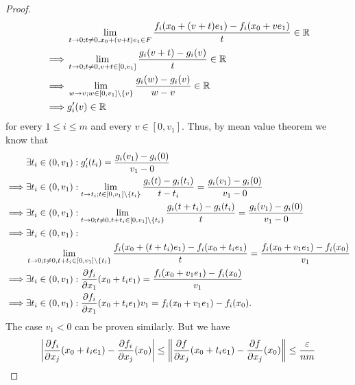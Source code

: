 \begin{proof}
\begin{align*}
             & \lim_{t \to 0 ; t \neq 0, x_0 + (v + t) e_1 \in F} \dfrac{f_i(x_0 + (v + t) e_1) - f_i(x_0 + v e_1)}{t} \in \R \\
    \implies & \lim_{t \to 0 ; t \neq 0, v + t \in [0, v_1]} \dfrac{g_i(v + t) - g_i(v)}{t} \in \R                            \\
    \implies & \lim_{w \to v ; w \in [0, v_1] \setminus \set{v}} \dfrac{g_i(w) - g_i(v)}{w - v} \in \R                        \\
    \implies & g_i'(v) \in \R
  \end{align*}
  for every \(1 \leq i \leq m\) and every \(v \in [0, v_1]\).
  Thus, by mean value theorem we know that
  \begin{align*}
             & \exists t_i \in (0, v_1) : g_i'(t_i) = \dfrac{g_i(v_1) - g_i(0)}{v_1 - 0}                                                                                                \\
    \implies & \exists t_i \in (0, v_1) : \lim_{t \to t_i; t \in [0, v_1] \setminus \set{t_i}} \dfrac{g_i(t) - g_i(t_i)}{t - t_i} = \dfrac{g_i(v_1) - g_i(0)}{v_1 - 0}                  \\
    \implies & \exists t_i \in (0, v_1) : \lim_{t \to 0; t \neq 0, t + t_i \in [0, v_1] \setminus \set{t_i}} \dfrac{g_i(t + t_i) - g_i(t_i)}{t} = \dfrac{g_i(v_1) - g_i(0)}{v_1 - 0}    \\
    \implies & \exists t_i \in (0, v_1) :                                                                                                                                               \\
             & \lim_{t \to 0; t \neq 0, t + t_i \in [0, v_1] \setminus \set{t_i}} \dfrac{f_i(x_0 + (t + t_i) e_1) - f_i(x_0 + t_i e_1)}{t} = \dfrac{f_i(x_0 + v_1 e_1) - f_i(x_0)}{v_1} \\
    \implies & \exists t_i \in (0, v_1) : \dfrac{\partial f_i}{\partial x_1}(x_0 + t_i e_1) = \dfrac{f_i(x_0 + v_1 e_1) - f_i(x_0)}{v_1}                                                \\
    \implies & \exists t_i \in (0, v_1) : \dfrac{\partial f_i}{\partial x_1}(x_0 + t_i e_1) v_1 = f_i(x_0 + v_1 e_1) - f_i(x_0).
  \end{align*}
  The case \(v_1 < 0\) can be proven similarly.
  But we have
  \[
    \abs{\dfrac{\partial f_i}{\partial x_j}(x_0 + t_i e_1) - \dfrac{\partial f_i}{\partial x_j}(x_0)} \leq \norm*{\dfrac{\partial f}{\partial x_j}(x_0 + t_i e_1) - \dfrac{\partial f}{\partial x_j}(x_0)} \leq \dfrac{\varepsilon}{nm}
  \]

\end{proof}
